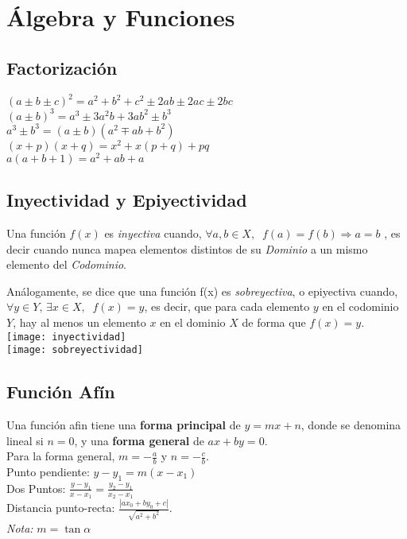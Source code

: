 \section{Álgebra y Funciones}
\def\svgwidth{\columnwidth}

\subsection{Factorización}
$ (a \pm b \pm c)^2 = a^2 + b^2 + c^2 \pm 2ab \pm 2ac \pm 2bc $\\
$(a \pm b)^3 = a^3 \pm 3a^2b + 3ab^2 \pm b^3$\\
$ a^3 \pm b^3 = (a \pm b)(a^2 \mp ab + b^2)$\\
$ (x + p)(x + q) = x^2 + x(p + q) + pq $\\
$ a (a + b + 1) = a^2 + ab + a $\\

\subsection{Inyectividad y Epiyectividad}
Una función $f(x)$ es \textit{inyectiva} cuando,
$\forall a,b \in X, \;\; f(a)=f(b) \Rightarrow a=b$
, es decir cuando nunca mapea elementos distintos de su \textit{Dominio} a un mismo elemento del \textit{Codominio}.

Análogamente, se dice que una función f(x) es \textit{sobreyectiva}, o epiyectiva cuando, $\forall y \in Y, \, \exists x \in X, \;\; f(x)=y$, es decir, que para cada elemento $y$ en el codominio $Y$, hay al menos un elemento $x$ en el dominio $X$ de forma que $f(x) = y$.\\
\texttt{[image: inyectividad]}\\
\texttt{[image: sobreyectividad]}
\subsection{Función Afín}
Una función afin tiene una \textbf{forma principal} de $y = mx + n$, donde se denomina lineal si $n=0$, y una \textbf{forma general} de $ax + by = 0$.\\
Para la forma general, $m = -\frac{a}{b}$ y $n = -\frac{c}{b}.$\\
Punto pendiente: $y - y_1 = m(x - x_1)$\\
Dos Puntos: $\frac{y-y_1}{x-x_1} = \frac{y_2-y_1}{x_2-x_1}$\\
Distancia punto-recta: $\frac{|ax_0+by_0+c|}{\sqrt{a^2+b^2}}.$\\
\textit{Nota:} $m = \tan \alpha$

